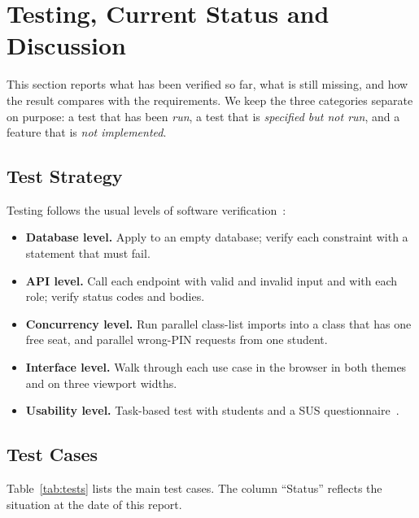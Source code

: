 \section{Testing, Current Status and Discussion}
\label{ch:eval}

This section reports what has been verified so far, what is still missing, and how the result compares with the requirements. We keep the three categories separate on purpose: a test that has been \emph{run}, a test that is \emph{specified but not run}, and a feature that is \emph{not implemented}.

\subsection{Test Strategy}

Testing follows the usual levels of software verification~\cite{sommerville2016software}:

\begin{itemize}
    \item \textbf{Database level.} Apply  to an empty database; verify each constraint with a statement that must fail.
    \item \textbf{API level.} Call each endpoint with valid and invalid input and with each role; verify status codes and bodies.
    \item \textbf{Concurrency level.} Run parallel class-list imports into a class that has one free seat, and parallel wrong-PIN requests from one student.
    \item \textbf{Interface level.} Walk through each use case in the browser in both themes and on three viewport widths.
    \item \textbf{Usability level.} Task-based test with students and a SUS questionnaire~\cite{brooke1996sus, bangor2008empirical}.
\end{itemize}

\subsection{Test Cases}

Table~\ref{tab:tests} lists the main test cases. The column ``Status'' reflects the situation at the date of this report.


